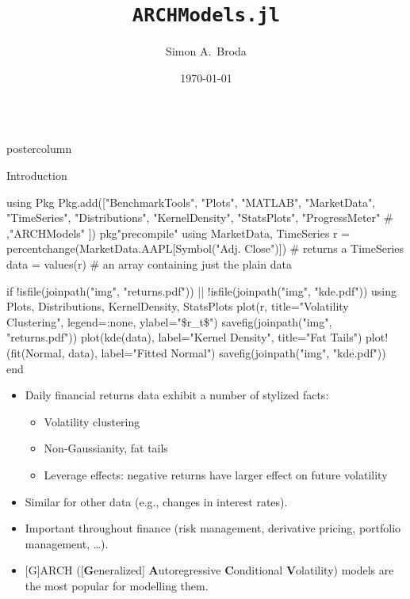 \documentclass{beamer}
\title{\huge \texttt{ARCHModels.jl}}
\author{Simon A.\ Broda}
\institute[UZH]{University of Zurich }
\date{\today}
\begin{document}
\begin{frame}[fragile]
\begin{columns}
\begin{column}{.48\textwidth}
\begin{beamercolorbox}[center]{postercolumn}
\begin{myblock}{Introduction}
\begin{juliacode}
using Pkg
Pkg.add(["BenchmarkTools", "Plots", "MATLAB",
             "MarketData", "TimeSeries", "Distributions",
             "KernelDensity", "StatsPlots", "ProgressMeter"
#             ,"ARCHModels"
])
pkg"precompile"
using MarketData, TimeSeries
r = percentchange(MarketData.AAPL[Symbol("Adj. Close")]) # returns a TimeSeries
data = values(r) # an array containing just the plain data

if !isfile(joinpath("img", "returns.pdf")) || !isfile(joinpath("img", "kde.pdf"))
    using Plots, Distributions, KernelDensity, StatsPlots
    plot(r, title="Volatility Clustering", legend=:none, ylabel="\$r_t\$")
    savefig(joinpath("img", "returns.pdf"))
    plot(kde(data), label="Kernel Density", title="Fat Tails")
    plot!(fit(Normal, data), label="Fitted Normal")
    savefig(joinpath("img", "kde.pdf"))
end
\end{juliacode}
\begin{itemize}
\item Daily financial returns data exhibit a number of {\color{red}stylized facts}:
\begin{itemize}
  \item Volatility clustering
  \item Non-Gaussianity, fat tails
  \item Leverage effects: negative returns have larger effect on future volatility
\end{itemize}
\item Similar for other data (e.g., changes in interest rates).
\item Important throughout finance (risk management, derivative pricing, portfolio management, \ldots).
\item {}[G]ARCH ([{\bf G}eneralized] {\bf A}utoregressive {\bf C}onditional {\bf V}olatility) models are the most popular for modelling them.
\end{itemize}
\vspace{1em}


\end{myblock}
\end{beamercolorbox}
\end{column}
\end{columns}
\end{frame}
\end{document}

